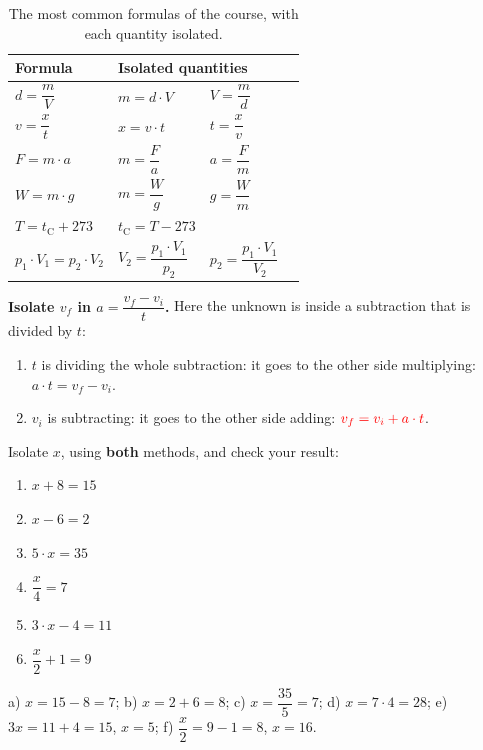 \begin{table}[H]
    \centering
    \renewcommand{\arraystretch}{2.2}
    \begin{tabular}{llll}
        \toprule
        \textbf{Formula} & \multicolumn{3}{l}{\textbf{Isolated quantities}} \\
        \midrule
         \(d = \dfrac{m}{V}\) & \(m = d \cdot V\) & \(V = \dfrac{m}{d}\) & \\
        \(v = \dfrac{x}{t}\) & \(x = v \cdot t\) & \(t = \dfrac{x}{v}\) & \\
        \(F = m \cdot a\) & \(m = \dfrac{F}{a}\) & \(a = \dfrac{F}{m}\) & \\
        \(W = m \cdot g\) & \(m = \dfrac{W}{g}\) & \(g = \dfrac{W}{m}\) & \\
        \(T = t_{\text{C}} + 273\) & \(t_{\text{C}} = T - 273\) & & \\
        \(p_1 \cdot V_1 = p_2 \cdot V_2\) & \(V_2 = \dfrac{p_1 \cdot V_1}{p_2}\) & \(p_2 = \dfrac{p_1 \cdot V_1}{V_2}\) & \\
        \bottomrule
    \end{tabular}
    \caption{The most common formulas of the course, with each quantity isolated.}
    \label{tab:u0_formulas}
\end{table}

\begin{example}
    \textbf{Isolate \(v_f\) in \(a = \dfrac{v_f - v_i}{t}\).} Here the unknown is inside a subtraction that is divided by \(t\):
    \begin{enumerate}[label=\numberballmDarkTeal]
        \item \(t\) is dividing the whole subtraction: it goes to the other side multiplying: \(a \cdot t = v_f - v_i\).
        \item \(v_i\) is subtracting: it goes to the other side adding: \(\textcolor{red}{v_f = v_i + a \cdot t}\).
    \end{enumerate}
\end{example}

\begin{exercise}
    Isolate \(x\), using \textbf{both} methods, and check your result:
    \begin{enumerate}[label=\letraminuscula]
        \item \(x + 8 = 15\)
        \item \(x - 6 = 2\)
        \item \(5 \cdot x = 35\)
        \item \(\dfrac{x}{4} = 7\)
        \item \(3 \cdot x - 4 = 11\)
        \item \(\dfrac{x}{2} + 1 = 9\)
    \end{enumerate}
    \begin{solu}
        a) \(x = 15 - 8 = 7\); b) \(x = 2 + 6 = 8\); c) \(x = \dfrac{35}{5} = 7\); d) \(x = 7 \cdot 4 = 28\); e) \(3x = 11 + 4 = 15\), \(x = 5\); f) \(\dfrac{x}{2} = 9 - 1 = 8\), \(x = 16\).
    \end{solu}
\end{exercise}

